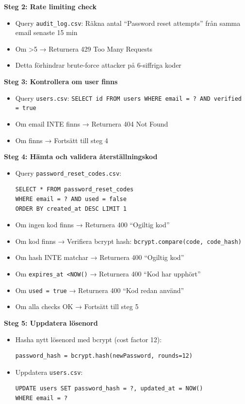 \documentclass[12pt,a4paper]{article}
\begin{document}
\textbf{Steg 2: Rate limiting check}
\begin{itemize}[noitemsep]
  \item Query \texttt{audit\_log.csv}: Räkna antal ``Password reset attempts'' från samma email senaste 15 min
  \item Om \textgreater 5 → Returnera 429 Too Many Requests
  \item Detta förhindrar brute-force attacker på 6-siffriga koder
\end{itemize}

\textbf{Steg 3: Kontrollera om user finns}
\begin{itemize}[noitemsep]
  \item Query \texttt{users.csv}: \texttt{SELECT id FROM users WHERE email = ? AND verified = true}
  \item Om email INTE finns → Returnera 404 Not Found
  \item Om finns → Fortsätt till steg 4
\end{itemize}

\textbf{Steg 4: Hämta och validera återställningskod}
\begin{itemize}[noitemsep]
  \item Query \texttt{password\_reset\_codes.csv}:
  \begin{verbatim}
SELECT * FROM password_reset_codes 
WHERE email = ? AND used = false 
ORDER BY created_at DESC LIMIT 1
  \end{verbatim}
  \item Om ingen kod finns → Returnera 400 ``Ogiltig kod''
  \item Om kod finns → Verifiera bcrypt hash: \texttt{bcrypt.compare(code, code\_hash)}
  \item Om hash INTE matchar → Returnera 400 ``Ogiltig kod''
  \item Om \texttt{expires\_at \textless NOW()} → Returnera 400 ``Kod har upphört''
  \item Om \texttt{used = true} → Returnera 400 ``Kod redan använd''
  \item Om alla checks OK → Fortsätt till steg 5
\end{itemize}

\textbf{Steg 5: Uppdatera lösenord}
\begin{itemize}[noitemsep]
  \item Hasha nytt lösenord med bcrypt (cost factor 12):
  \begin{verbatim}
password_hash = bcrypt.hash(newPassword, rounds=12)
  \end{verbatim}
  \item Uppdatera \texttt{users.csv}:
  \begin{verbatim}
UPDATE users SET password_hash = ?, updated_at = NOW() 
WHERE email = ?
  \end{verbatim}
\end{itemize}
\end{document}
